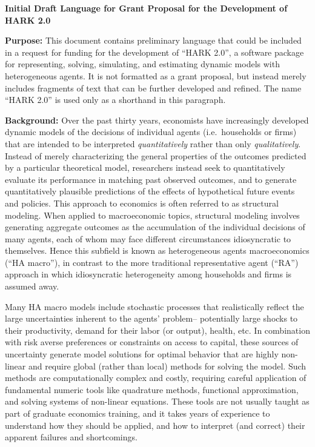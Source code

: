 \documentclass[12pt,pdftex,letterpaper]{article}
\begin{document}
\begin{center}
	\singlespacing \textbf{Initial Draft Language for Grant Proposal for the Development of HARK 2.0}
\end{center}

\noindent \textbf{Purpose:} This document contains preliminary language that could be included in a request for funding for the development of ``HARK 2.0'', a software package for representing, solving, simulating, and estimating dynamic models with heterogeneous agents. It is not formatted as a grant proposal, but instead merely includes fragments of text that can be further developed and refined.  The name ``HARK 2.0'' is used only as a shorthand in this paragraph. 

\vspace{0.5cm}

\noindent \textbf{Background:} Over the past thirty years, economists have increasingly developed dynamic models of the decisions of individual agents (i.e.\ households or firms) that are intended to be interpreted \textit{quantitatively} rather than only \textit{qualitatively}. Instead of merely characterizing the general properties of the outcomes predicted by a particular theoretical model, researchers instead seek to quantitatively evaluate its performance in matching past observed outcomes, and to generate quantitatively plausible predictions of the effects of hypothetical future events and policies. This approach to economics is often referred to as structural modeling. When applied to macroeconomic topics, structural modeling involves generating aggregate outcomes as the accumulation of the individual decisions of many agents, each of whom may face different circumstances idiosyncratic to themselves. Hence this subfield is known as heterogeneous agents macroeconomics (``HA macro''), in contrast to the more traditional representative agent (``RA'') approach in which idiosyncratic heterogeneity among households and firms is assumed away.

Many HA macro models include stochastic processes that realistically reflect the large uncertainties inherent to the agents' problem-- potentially large shocks to their productivity, demand for their labor (or output), health, etc. In combination with risk averse preferences or constraints on access to capital, these sources of uncertainty generate model solutions for optimal behavior that are highly non-linear and require global (rather than local) methods for solving the model. Such methods are computationally complex and costly, requiring careful application of fundamental numeric tools like quadrature methods, functional approximation, and solving systems of non-linear equations. These tools are not usually taught as part of graduate economics training, and it takes years of experience to understand how they should be applied, and how to interpret (and correct) their apparent failures and shortcomings.
\end{document}
